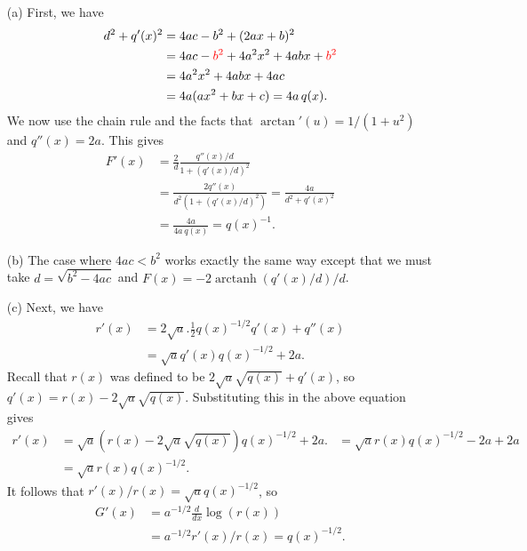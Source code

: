 \documentclass[a4paper]{book}
\newcommand{\RED}[1]{{\color{red}#1}}
\newcommand{\arctanh}  {\operatorname{arctanh}}
\renewcommand{\:}{\colon}
\theoremstyle{definition}
\renewenvironment{solution}{\SolutionInline}{\endSolutionInline}
\begin{document}
\begin{solution}
 \begin{itemize}
  \item[(a)] First, we have
   \begin{align*}
    d^2 + q'(x)^2 &= 4ac-b^2 + (2ax+b)^2 \\
                  &= 4ac - \RED{b^2} + 4a^2x^2 + 4abx + \RED{b^2} \\
                  &= 4a^2x^2 + 4abx + 4ac \\
                  &= 4a(ax^2+bx+c) = 4a\, q(x).
   \end{align*}
   We now use the chain rule and the facts that
   $\arctan'(u)=1/(1+u^2)$ and $q''(x)=2a$.  This gives
   \begin{align*}
    F'(x) &= \frac{2}{d} \frac{q''(x)/d}{1+(q'(x)/d)^2} \\
          &= \frac{2q''(x)}{d^2(1+(q'(x)/d)^2)}
           = \frac{4a}{d^2+q'(x)^2} \\
          &= \frac{4a}{4a\,q(x)} = q(x)^{-1}.
   \end{align*}
  \item[(b)] The case where $4ac<b^2$ works exactly the same way
   except that we must take $d=\sqrt{b^2-4ac}$ and
   $F(x)=-2\arctanh(q'(x)/d)/d$.
  \item[(c)] Next, we have
   \begin{align*}
    r'(x) &= 2\sqrt{a}.\frac{1}{2}q(x)^{-1/2}q'(x) + q''(x) \\
          &= \sqrt{a}q'(x)q(x)^{-1/2} + 2a.
   \end{align*}
   Recall that $r(x)$ was defined to be $2\sqrt{a}\sqrt{q(x)}+q'(x)$,
   so $q'(x)=r(x)-2\sqrt{a}\sqrt{q(x)}$.  Substituting this in the
   above equation gives
   \begin{align*}
    r'(x) &= \sqrt{a}(r(x)-2\sqrt{a}\sqrt{q(x)})q(x)^{-1/2} + 2a.
          &= \sqrt{a}r(x)q(x)^{-1/2} - 2a + 2a \\
          &= \sqrt{a}r(x)q(x)^{-1/2}.
   \end{align*}
   It follows that $r'(x)/r(x)=\sqrt{a} q(x)^{-1/2}$, so 
   \begin{align*}
    G'(x) &= a^{-1/2}\frac{d}{dx}\log(r(x)) \\
          &= a^{-1/2} r'(x)/r(x) = q(x)^{-1/2}.
   \end{align*}
 \end{itemize}
\end{solution}
\end{document}
